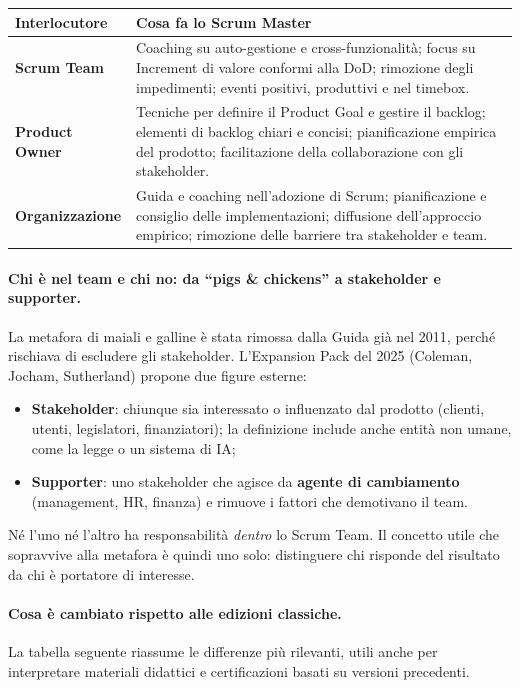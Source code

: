 \documentclass[12pt]{extarticle}
\begin{document}
\begin{center}
\small
\begin{tabular}{p{3.6cm}p{11.4cm}}
    \toprule
    \textbf{Interlocutore} & \textbf{Cosa fa lo Scrum Master} \\
    \midrule
    \textbf{Scrum Team} & Coaching su auto-gestione e cross-funzionalità; focus su Increment di valore conformi alla DoD; rimozione degli impedimenti; eventi positivi, produttivi e nel timebox. \\
    \addlinespace
    \textbf{Product Owner} & Tecniche per definire il Product Goal e gestire il backlog; elementi di backlog chiari e concisi; pianificazione empirica del prodotto; facilitazione della collaborazione con gli stakeholder. \\
    \addlinespace
    \textbf{Organizzazione} & Guida e coaching nell'adozione di Scrum; pianificazione e consiglio delle implementazioni; diffusione dell'approccio empirico; rimozione delle barriere tra stakeholder e team. \\
    \bottomrule
\end{tabular}
\end{center}

\paragraph{Chi è nel team e chi no: da ``pigs \& chickens'' a stakeholder e supporter.}
La metafora di maiali e galline è stata rimossa dalla Guida già nel 2011, perché rischiava di escludere gli stakeholder. L'Expansion Pack del 2025 (Coleman, Jocham, Sutherland) propone due figure esterne:
\begin{itemize}
    \item \textbf{Stakeholder}: chiunque sia interessato o influenzato dal prodotto (clienti, utenti, legislatori, finanziatori); la definizione include anche entità non umane, come la legge o un sistema di IA;
    \item \textbf{Supporter}: uno stakeholder che agisce da \textbf{agente di cambiamento} (management, HR, finanza) e rimuove i fattori che demotivano il team.
\end{itemize}
Né l'uno né l'altro ha responsabilità \textit{dentro} lo Scrum Team. Il concetto utile che sopravvive alla metafora è quindi uno solo: distinguere chi risponde del risultato da chi è portatore di interesse.

\paragraph{Cosa è cambiato rispetto alle edizioni classiche.}
La tabella seguente riassume le differenze più rilevanti, utili anche per interpretare materiali didattici e certificazioni basati su versioni precedenti.
\end{document}
